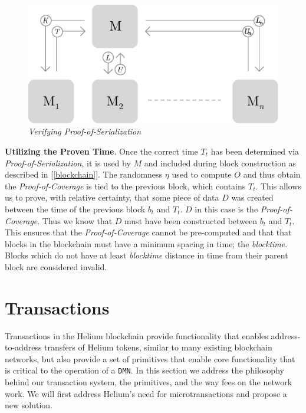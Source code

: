 \documentclass[UTF8, 10pt, nonatbib, nocopyrightspace, reprint]{sigplanconf}
\newcommand{\secref}[1]{[\autoref{#1}]}
\begin{document}
\begin{figure}[ht]
    \begin{center}
          \includegraphics[width=\columnwidth]{verify_serialization.eps}
          \caption{\emph{Verifying Proof-of-Serialization}}
          \label{fig:verify-serialization}
     \end{center}
\end{figure}

\textbf{Utilizing the Proven Time}. Once the correct time $T_t$ has been determined via \emph{Proof-of-Serialization}, it is used by $M$ and included during block construction as described in \secref{blockchain}. The randomness $\eta$ used to compute $O$ and thus obtain the \emph{Proof-of-Coverage} is tied to the previous block, which contains $T_t$. This allows us to prove, with relative certainty, that some piece of data $D$ was created between the time of the previous block $b_t$ and $T_t$. $D$ in this case is the \emph{Proof-of-Coverage}. Thus we know that $D$ must have been constructed between $b_t$ and $T_t$. This ensures that the \emph{Proof-of-Coverage} cannot be pre-computed and that that blocks in the blockchain must have a minimum spacing in time; the \emph{blocktime}. Blocks which do not have at least \emph{blocktime} distance in time from their parent block are considered invalid.

\section{Transactions}\label{transactions}

Transactions in the Helium blockchain provide functionality that enables address-to-address transfers of Helium tokens, similar to many existing blockchain networks, but also provide a set of primitives that enable core functionality that is critical to the operation of a \verb|DMN|. In this section we address the philosophy behind our transaction system, the primitives, and the way fees on the network work. We will first address Helium's need for microtransactions and propose a new solution.
\end{document}
